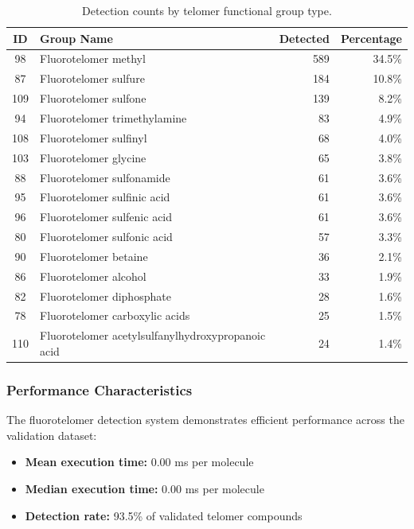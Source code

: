 \begin{table}[htbp]
\centering
\caption{Detection counts by telomer functional group type.}
\label{tab:telomer_groups}
\begin{tabular}{clrr}
\toprule
\textbf{ID} & \textbf{Group Name} & \textbf{Detected} & \textbf{Percentage} \\
\midrule
98 & Fluorotelomer methyl & 589 & 34.5\% \\
87 & Fluorotelomer sulfure & 184 & 10.8\% \\
109 & Fluorotelomer sulfone & 139 & 8.2\% \\
94 & Fluorotelomer trimethylamine & 83 & 4.9\% \\
108 & Fluorotelomer sulfinyl & 68 & 4.0\% \\
103 & Fluorotelomer glycine & 65 & 3.8\% \\
88 & Fluorotelomer sulfonamide & 61 & 3.6\% \\
95 & Fluorotelomer sulfinic acid & 61 & 3.6\% \\
96 & Fluorotelomer sulfenic acid & 61 & 3.6\% \\
80 & Fluorotelomer sulfonic acid & 57 & 3.3\% \\
90 & Fluorotelomer betaine & 36 & 2.1\% \\
86 & Fluorotelomer alcohol & 33 & 1.9\% \\
82 & Fluorotelomer diphosphate & 28 & 1.6\% \\
78 & Fluorotelomer carboxylic acids & 25 & 1.5\% \\
110 & Fluorotelomer acetylsulfanylhydroxypropanoic acid & 24 & 1.4\% \\
\bottomrule
\end{tabular}
\end{table}

\subsubsection*{Performance Characteristics}

The fluorotelomer detection system demonstrates efficient performance across the validation dataset:

\begin{itemize}
\item \textbf{Mean execution time:} 0.00 ms per molecule
\item \textbf{Median execution time:} 0.00 ms per molecule
\item \textbf{Detection rate:} 93.5\% of validated telomer compounds
\end{itemize}

